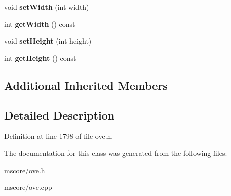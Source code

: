 \begin{DoxyCompactItemize}
\mbox{\label{class_o_v_e_1_1_text_aae1e9f215d697954234a65ff4941e748}} 
void {\bfseries set\+Width} (int width)
\item 
\mbox{\label{class_o_v_e_1_1_text_a386e3c21fffc513682d6e72fe7ba5572}} 
int {\bfseries get\+Width} () const
\item 
\mbox{\label{class_o_v_e_1_1_text_a9c770deda037a35ed5598727191f4642}} 
void {\bfseries set\+Height} (int height)
\item 
\mbox{\label{class_o_v_e_1_1_text_a0b2b1057dba90fe2f89e64fc462307a0}} 
int {\bfseries get\+Height} () const
\end{DoxyCompactItemize}
\subsection*{Additional Inherited Members}


\subsection{Detailed Description}


Definition at line 1798 of file ove.\+h.



The documentation for this class was generated from the following files\+:\begin{DoxyCompactItemize}
\item 
mscore/ove.\+h\item 
mscore/ove.\+cpp\end{DoxyCompactItemize}
